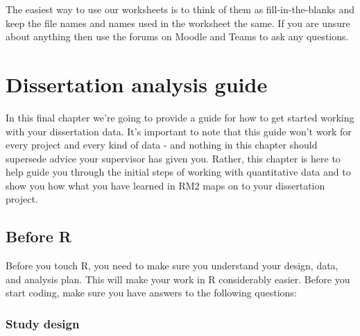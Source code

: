 \documentclass[]{book}
\begin{document}
The easiest way to use our worksheets is to think of them as fill-in-the-blanks and keep the file names and names used in the worksheet the same. If you are unsure about anything then use the forums on Moodle and Teams to ask any questions.

\hypertarget{dissertation-analysis-guide}{%
\chapter{Dissertation analysis guide}\label{dissertation-analysis-guide}}

In this final chapter we're going to provide a guide for how to get started working with your dissertation data. It's important to note that this guide won't work for every project and every kind of data - and nothing in this chapter should supersede advice your supervisor has given you. Rather, this chapter is here to help guide you through the initial steps of working with quantitative data and to show you how what you have learned in RM2 maps on to your dissertation project.

\hypertarget{before-r}{%
\section{Before R}\label{before-r}}

Before you touch R, you need to make sure you understand your design, data, and analysis plan. This will make your work in R considerably easier. Before you start coding, make sure you have answers to the following questions:

\hypertarget{study-design}{%
\subsection{Study design}\label{study-design}}
\end{document}
